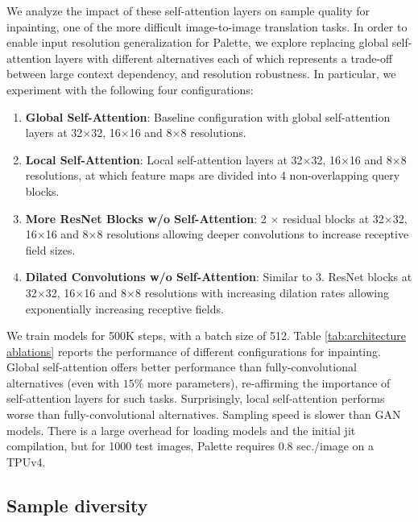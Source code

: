 We analyze the impact of these self-attention layers on sample quality for inpainting, one of the more difficult image-to-image translation tasks. In order to enable input resolution generalization for Palette, we explore replacing global self-attention layers with different alternatives each of which represents a trade-off between large context dependency, and resolution robustness. In particular, we experiment with the following four configurations:

\begin{enumerate}[topsep=0.21pt, partopsep=0pt, leftmargin=13pt, parsep=0pt, itemsep=0.1pt]
    \item \textbf{Global Self-Attention}: Baseline configuration with global self-attention layers at 32$\times$32, 16$\times$16 and 8$\times$8 resolutions. 
    \item \textbf{Local Self-Attention}: Local self-attention layers \citep{vaswani2021scaling} at 32$\times$32, 16$\times$16 and 8$\times$8 resolutions, at which feature maps are divided into 4 non-overlapping query blocks.
    \item \textbf{More ResNet Blocks w/o Self-Attention}: 2 $\times$ residual blocks at 32$\times$32, 16$\times$16 and 8$\times$8 resolutions allowing deeper convolutions to increase receptive field sizes.
    \item \textbf{Dilated Convolutions w/o Self-Attention}: Similar to 3. ResNet blocks at 32$\times$32, 16$\times$16 and 8$\times$8 resolutions with increasing dilation rates \citep{chen2017rethinking} allowing exponentially increasing receptive fields.
\end{enumerate}

We train models for 500K steps, with a batch size of 512. Table \ref{tab:architecture ablations} reports the performance of different configurations for inpainting. Global self-attention offers  better performance than fully-convolutional alternatives (even with $15\%$ more parameters), re-affirming the importance of self-attention layers for such tasks.  Surprisingly, local self-attention performs worse than fully-convolutional alternatives. Sampling speed is slower than GAN models. There is a large overhead for loading models and the initial  jit compilation, but for 1000 test images, Palette requires 0.8 sec./image on a TPUv4.

\subsection{Sample diversity}


